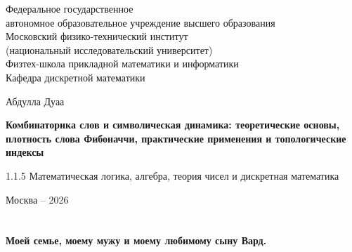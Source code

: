 \documentclass[a4paper,14pt]{extreport}
\theoremstyle{plain}
\theoremstyle{definition}
\theoremstyle{remark}
\begin{document}
	
    \hypersetup{pageanchor=false}
	
	\begin{titlepage}
		\thispagestyle{empty} 
		\centering
		{\fontsize{12}{12}\selectfont Федеральное государственное\\ автономное образовательное учреждение высшего образования\\ Московский физико-технический институт \\
			(национальный исследовательский университет) \\Физтех-школа прикладной математики и информатики\\ Кафедра дискретной математики \par}
		
		\vspace{1.5cm}
		
		\vspace{2.5cm}
		\centering
		{\Large Абдулла Дуаа  \par}
		\vspace{1cm}
		{\Large \textbf{Комбинаторика слов и символическая динамика: теоретические основы, плотность слова Фибоначчи, практические применения и топологические индексы} \par}
		\vspace{1cm}
		{\large 1.1.5 Математическая логика, алгебра, теория чисел и дискретная математика \par}
\vspace{0.4cm}{\small Редакция с математическими исправлениями от 17.11.2026\par} 
		
		\vspace{1cm}
		
		\centering
		\vfill
		{\large Москва -- 2026 \par}
	\end{titlepage}
\hypersetup{pageanchor=true}
	
	
	\newpage
	\tableofcontents
    \newpage
	\listoffigures
	\newpage
	\listoftables
	\listofalgorithms
	\chapter*{}
	\thispagestyle{empty}
	\vspace*{\fill}
	\begin{center}
		\textbf{Моей семье, моему мужу и моему любимому сыну Вард.}
	\end{center}
	\vspace*{\fill}
	\clearpage  
\end{document}
